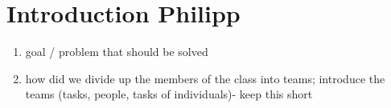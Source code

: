 \section{Introduction Philipp}
\begin{enumerate}
    \item goal / problem that should be solved
    \item how did we divide up the members of the class into teams; introduce
    the teams (tasks, people, tasks of individuals)- keep this short
\end{enumerate}
